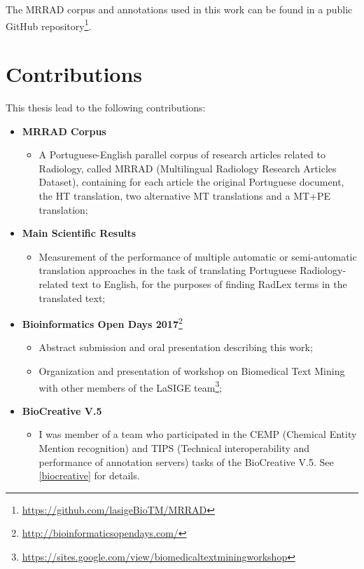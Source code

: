 The MRRAD corpus and annotations used in this work can be found in a public GitHub repository\footnote{\url{https://github.com/lasigeBioTM/MRRAD}}.


\section{Contributions}

This thesis lead to the following contributions: 

\begin{itemize}

\item \textbf{MRRAD Corpus}
	\begin{itemize}
		\item A Portuguese-English parallel corpus of research articles related to Radiology, called MRRAD (Multilingual Radiology Research Articles Dataset), containing for each article the original Portuguese document, the HT translation, two alternative MT translations and a MT+PE translation;
	\end{itemize}
	
\item \textbf{Main Scientific Results}
	\begin{itemize}
		\item Measurement of the performance of multiple automatic or semi-automatic translation approaches in the task of translating Portuguese Radiology-related text to English, for the purposes of finding RadLex terms in the translated text;
	\end{itemize}

\item \textbf{Bioinformatics Open Days 2017}\footnote{\url{http://bioinformaticsopendays.com/}}
	\begin{itemize}
	\item Abstract submission and oral presentation describing this work;
	\item Organization and presentation of workshop on Biomedical Text Mining with other members of the LaSIGE team\footnote{\url{https://sites.google.com/view/biomedicaltextminingworkshop}};
	\end{itemize}
	
\item \textbf{BioCreative V.5}
	\begin{itemize}
		\item I was member of a team who participated in the CEMP (Chemical Entity Mention recognition) and TIPS (Technical interoperability and performance of annotation servers) tasks of the BioCreative V.5. See \ref{biocreative} for details. 
	\end{itemize}
	

\end{itemize}
